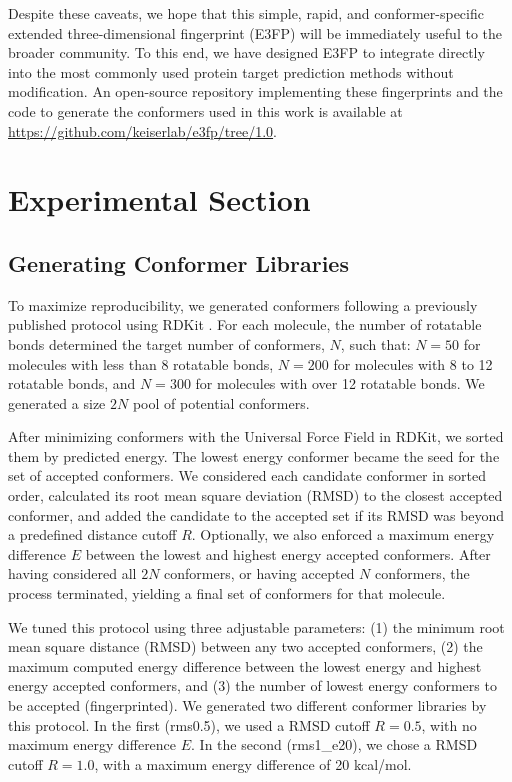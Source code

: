 \documentclass[../main.tex]{subfiles}
\begin{document}
\begin{refsection}
Despite these caveats, we hope that this simple, rapid, and conformer-specific extended three-dimensional fingerprint (E3FP) will be immediately useful to the broader community.
To this end, we have designed E3FP to integrate directly into the most commonly used protein target prediction methods without modification.
An open-source repository implementing these fingerprints and the code to generate the conformers used in this work is available at \url{https://github.com/keiserlab/e3fp/tree/1.0}.

\section{Experimental Section}\label{sec:expsec}

\subsection*{Generating Conformer Libraries}

To maximize reproducibility, we generated conformers following a previously published protocol \cite{ebejer_2012} using RDKit  \cite{rdkit}.
For each molecule, the number of rotatable bonds determined the target number of conformers, $N$, such that: $N=50$ for molecules with less than 8 rotatable bonds, $N=200$ for molecules with 8 to 12 rotatable bonds, and $N=300$ for molecules with over 12 rotatable bonds.
We generated a size $2N$ pool of potential conformers.

After minimizing conformers with the Universal Force Field  \cite{rappe_1992} in RDKit, we sorted them by predicted energy.
The lowest energy conformer became the seed for the set of accepted conformers.
We considered each candidate conformer in sorted order, calculated its root mean square deviation (RMSD) to the closest accepted conformer, and added the candidate to the accepted set if its RMSD was beyond a predefined distance cutoff $R$.
Optionally, we also enforced a maximum energy difference $E$ between the lowest and highest energy accepted conformers.
After having considered all  $2N$ conformers, or having accepted $N$ conformers, the process terminated, yielding a final set of conformers for that molecule.

We tuned this protocol using three adjustable parameters: (1) the minimum root mean square distance (RMSD) between any two accepted conformers, (2) the maximum computed energy difference between the lowest energy and highest energy accepted conformers, and (3) the number of lowest energy conformers to be accepted (fingerprinted).
We generated two different conformer libraries by this protocol.
In the first  (rms0.5), we used a RMSD cutoff $R=0.5$, with no maximum energy difference $E$.
In the second (rms1\_e20), we chose a RMSD cutoff  $R=1.0$, with a maximum energy difference of 20 kcal/mol.


\end{refsection}
\end{document}
